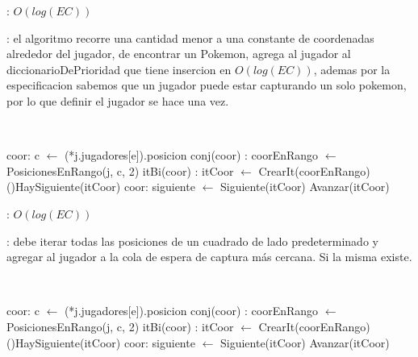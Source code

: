 \begin{Algoritmos}
	\complejidad: $O(log(EC))$

	\justifcomp: el algoritmo recorre una cantidad menor a una constante de coordenadas alrededor del jugador, de encontrar un Pokemon, agrega al jugador al diccionarioDePrioridad que tiene insercion en $O(log(EC))$, ademas por la especificacion sabemos que un jugador puede estar capturando un solo pokemon, por lo que definir el jugador se hace una vez.

	~

	\begin{algorithm}[H]
		\NoCaptionOfAlgo
		\caption{}
		\BlankLine
		coor: c $\leftarrow$ (*j.jugadores[e]).posicion
		conj(coor) : coorEnRango $\leftarrow$ PosicionesEnRango(j, c, 2)
		itBi(coor) : itCoor $\leftarrow$ CrearIt(coorEnRango)
		\While(){HaySiguiente(itCoor)}{
			coor: siguiente $\leftarrow$ Siguiente(itCoor)
			Avanzar(itCoor)
		}
	\end{algorithm}

	\complejidad: $O(log(EC))$

	\justifcomp: debe iterar todas las posiciones de un cuadrado de lado predeterminado y agregar al jugador a la cola de espera de captura más cercana. Si la misma existe.

	~

	\begin{algorithm}[H]
		\NoCaptionOfAlgo
		\caption{}
		\BlankLine
		coor: c $\leftarrow$ (*j.jugadores[e]).posicion
		conj(coor) : coorEnRango $\leftarrow$ PosicionesEnRango(j, c, 2)
		itBi(coor) : itCoor $\leftarrow$ CrearIt(coorEnRango)
		\While(){HaySiguiente(itCoor)}{
			coor: siguiente $\leftarrow$ Siguiente(itCoor)
			Avanzar(itCoor)
		}
	\end{algorithm}


\end{Algoritmos}
